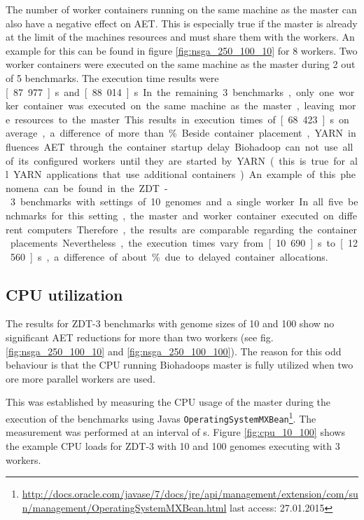 The number of worker containers running on the same machine as the master can also have a negative effect on AET. This is especially true if the master is already at the limit of the machines resources and must share them with the workers. An example for this can be found in figure \ref{fig:nsga_250_100_10} for 8 workers. Two worker containers were executed on the same machine as the master during 2 out of 5 benchmarks. The execution time results were \unit[87.977]{s} and \unit[88.014]{s}. In the remaining 3 benchmarks, only one worker container was executed on the same machine as the master, leaving more resources to the master. This results in execution times of \unit[68.423]{s} on average, a difference of more than \unit[20]{\%}.

Beside container placement, YARN influences AET through the container startup delay. Biohadoop can not use all of its configured workers until they are started by YARN (this is true for all YARN applications that use additional containers). An example of this phenomena can be found in the ZDT-3 benchmarks with settings of 10 genomes and a single worker. In all five benchmarks for this setting, the master and worker container executed on different computers. Therefore, the results are comparable regarding the container placements. Nevertheless, the execution times vary from \unit[10.690]{s} to \unit[12.560]{s}, a difference of about \unit[15]{\%} due to delayed container allocations.

\subsection{CPU utilization}
\label{chap:evaluation:influence-cpu}
The results for ZDT-3 benchmarks with genome sizes of 10 and 100 show no significant AET reductions for more than two workers (see fig. \ref{fig:nsga_250_100_10} and \ref{fig:nsga_250_100_100}). The reason for this odd behaviour is that the CPU running Biohadoops master is fully utilized when two ore more parallel workers are used.

This was established by measuring the CPU usage of the master during the execution of the benchmarks using Javas \texttt{OperatingSystemMXBean}\footnote{\url{http://docs.oracle.com/javase/7/docs/jre/api/management/extension/com/sun/management/OperatingSystemMXBean.html} last access: 27.01.2015}. The measurement was performed at an interval of \unit[1]{s}. Figure \ref{fig:cpu_10_100} shows the example CPU loads for ZDT-3 with 10 and 100 genomes executing with 3 workers.

